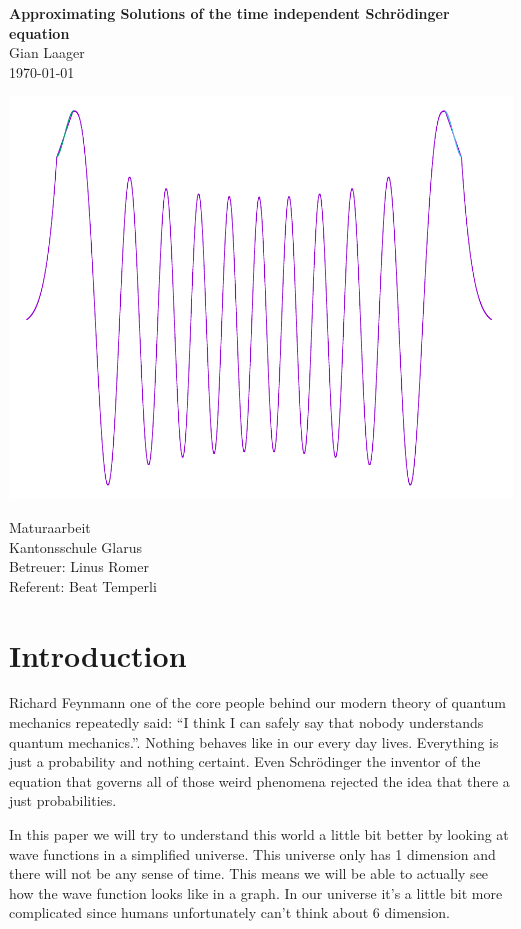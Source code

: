 \documentclass[11pt,DIV=10,final]{scrreprt} %
\begin{document}
\begin{titlepage}
\mbox{}\vspace{0.1\textheight}
\begin{center}
\textbf{\Huge Approximating Solutions of the time independent Schrödinger equation}\\[3ex]
Gian Laager\\
\today
\vspace{0.05\textheight}
\begin{center}
	\includegraphics[width=.7\textwidth]{wave_func_square.pdf}
\end{center}
\vspace{0.05\textheight}
Maturaarbeit\\
Kantonsschule Glarus\\
Betreuer: Linus Romer\\
Referent: Beat Temperli
\end{center}
\end{titlepage}


\tableofcontents

\chapter{Introduction}  %
Richard Feynmann one of the core people behind our modern theory of quantum mechanics repeatedly said: ``I think I can safely say that nobody understands quantum mechanics.''.
Nothing behaves like in our every day lives. Everything is just a probability and nothing certaint.
Even Schrödinger the inventor of the equation that governs all of those weird phenomena rejected the idea that there a just probabilities.

In this paper we will try to understand this world a little bit better by looking at wave functions in a simplified universe.
This universe only has 1 dimension and there will not be any sense of time. This means we will be able to actually see how the wave function looks like in a graph. In our universe it's a little bit more complicated since humans unfortunately can't think about 6 dimension.
\end{document}
